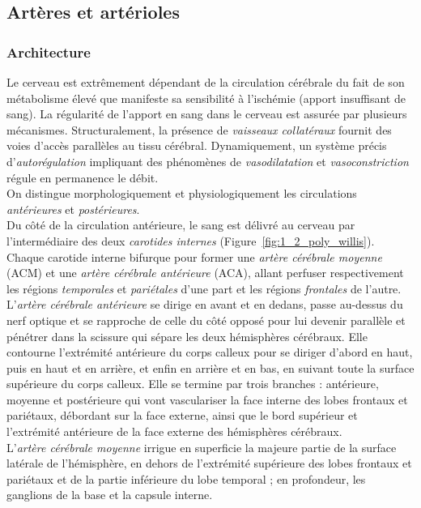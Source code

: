 \subsection{Artères et artérioles}
\label{sec:anat_art}
\subsubsection{Architecture}
Le cerveau est extrêmement dépendant de la circulation cérébrale du fait de son métabolisme élevé que manifeste sa sensibilité à l’ischémie (apport insuffisant de sang). La régularité de l’apport en sang dans le cerveau est assurée par plusieurs mécanismes. Structuralement, la présence de {\em vaisseaux collatéraux} fournit des voies d’accès parallèles au tissu cérébral. Dynamiquement, un système précis d’{\em autorégulation}  impliquant des phénomènes de {\em vasodilatation} et {\em vasoconstriction} régule en permanence le débit.\\
On distingue morphologiquement et physiologiquement les circulations {\em antérieures} et {\em postérieures}. \\
Du côté de la circulation antérieure, le sang est délivré au cerveau par l’intermédiaire des deux {\em carotides internes} (Figure~\ref{fig:1_2_poly_willis}). Chaque carotide interne bifurque pour former une {\em artère cérébrale moyenne} (ACM) et une {\em artère cérébrale antérieure} (ACA), allant perfuser respectivement les régions {\em temporales} et {\em pariétales} d’une part et les régions {\em frontales} de l’autre. \\
L’{\em artère cérébrale antérieure} se dirige en avant et en dedans, passe au-dessus du nerf optique et se rapproche de celle du côté opposé pour lui devenir parallèle et pénétrer dans la scissure qui sépare les deux hémisphères cérébraux. Elle contourne l'extrémité antérieure du corps calleux pour se diriger d'abord en haut, puis en haut et en arrière, et enfin en arrière et en bas, en suivant toute la surface supérieure du corps calleux. Elle se termine par trois branches : antérieure, moyenne et postérieure qui vont vasculariser la face interne des lobes frontaux et pariétaux, débordant sur la face externe, ainsi que le bord supérieur et l'extrémité antérieure de la face externe des hémisphères cérébraux.\\
L'{\em artère cérébrale moyenne} irrigue en superficie la majeure partie de la surface latérale de l'hémisphère, en dehors de l'extrémité supérieure des lobes frontaux et pariétaux et de la partie inférieure du lobe temporal ; en profondeur, les ganglions de la base et la capsule interne.\\
